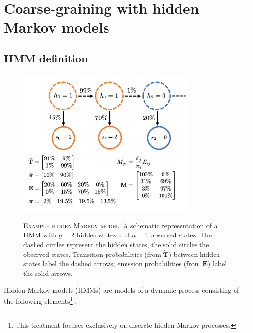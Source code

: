 \section{Coarse-graining with hidden Markov models}\label{sec:theory_hmm}
\subsection{HMM definition}
\begin{figure}
    \centering
    \caption[Example hidden Markov model]{\textsc{Example hidden Markov model}. A schematic representation of a HMM with $g=2$ hidden states and $n=4$ observed states. The dashed circles represent the hidden states, the solid circles the observed states. Transition probabilities (from $\widetilde{\mathbf{T}}$) between hidden states label the dashed arrows; emission probabilities (from $\mathbf{E}$) label the solid arrows. }
    \includegraphics[width=0.8\textwidth]{chapters/theory/figures/hmm.png}
    \label{fig:theory_hmm}
\end{figure}
Hidden Markov models (HMMs) are models of a dynamic process consisting of the following elements\footnote{This treatment focuses exclusively on discrete hidden Markov processes.} \cite{rabinerTutorialHiddenMarkov1989}:
